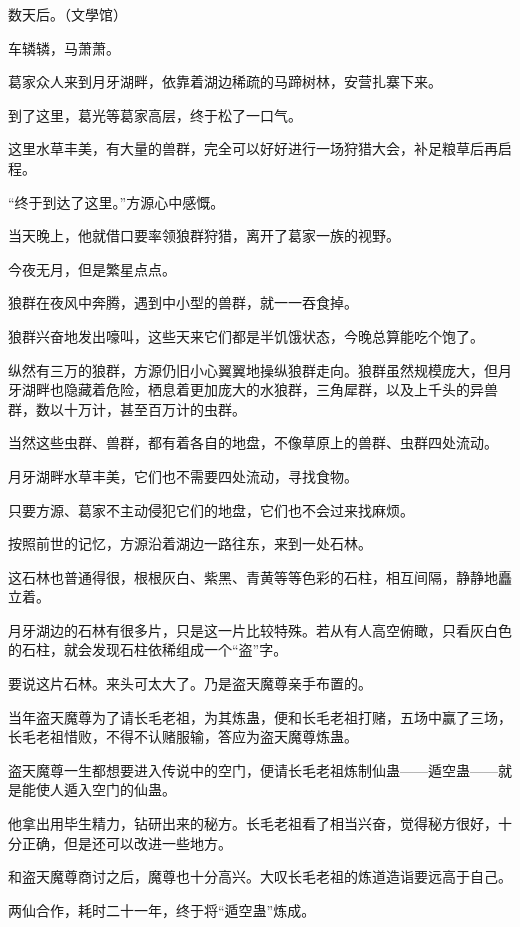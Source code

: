
\begin{this_body}

数天后。（文學馆）

车辚辚，马萧萧。

葛家众人来到月牙湖畔，依靠着湖边稀疏的马蹄树林，安营扎寨下来。

到了这里，葛光等葛家高层，终于松了一口气。

这里水草丰美，有大量的兽群，完全可以好好进行一场狩猎大会，补足粮草后再启程。

“终于到达了这里。”方源心中感慨。

当天晚上，他就借口要率领狼群狩猎，离开了葛家一族的视野。

今夜无月，但是繁星点点。

狼群在夜风中奔腾，遇到中小型的兽群，就一一吞食掉。

狼群兴奋地发出嚎叫，这些天来它们都是半饥饿状态，今晚总算能吃个饱了。

纵然有三万的狼群，方源仍旧小心翼翼地操纵狼群走向。狼群虽然规模庞大，但月牙湖畔也隐藏着危险，栖息着更加庞大的水狼群，三角犀群，以及上千头的异兽群，数以十万计，甚至百万计的虫群。

当然这些虫群、兽群，都有着各自的地盘，不像草原上的兽群、虫群四处流动。

月牙湖畔水草丰美，它们也不需要四处流动，寻找食物。

只要方源、葛家不主动侵犯它们的地盘，它们也不会过来找麻烦。

按照前世的记忆，方源沿着湖边一路往东，来到一处石林。

这石林也普通得很，根根灰白、紫黑、青黄等等色彩的石柱，相互间隔，静静地矗立着。

月牙湖边的石林有很多片，只是这一片比较特殊。若从有人高空俯瞰，只看灰白色的石柱，就会发现石柱依稀组成一个“盗”字。

要说这片石林。来头可太大了。乃是盗天魔尊亲手布置的。

当年盗天魔尊为了请长毛老祖，为其炼蛊，便和长毛老祖打赌，五场中赢了三场，长毛老祖惜败，不得不认赌服输，答应为盗天魔尊炼蛊。

盗天魔尊一生都想要进入传说中的空门，便请长毛老祖炼制仙蛊——遁空蛊——就是能使人遁入空门的仙蛊。

他拿出用毕生精力，钻研出来的秘方。长毛老祖看了相当兴奋，觉得秘方很好，十分正确，但是还可以改进一些地方。

和盗天魔尊商讨之后，魔尊也十分高兴。大叹长毛老祖的炼道造诣要远高于自己。

两仙合作，耗时二十一年，终于将“遁空蛊”炼成。


\end{this_body}
